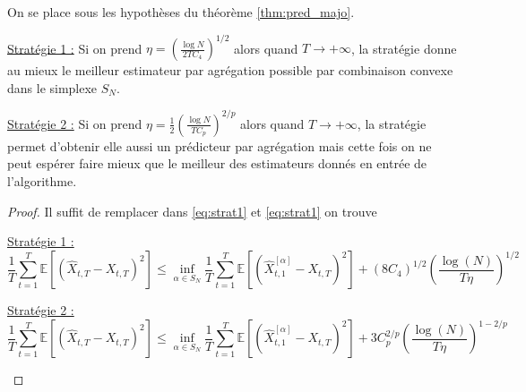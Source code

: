 \documentclass{report}
\begin{document}
\begin{Cor} On se place sous les hypothèses du théorème \ref{thm:pred_majo}. 
\begin{description}
\item{\underline{Stratégie 1 :}} Si on prend $\eta = \left(\frac{\log N}{2TC_4} \right)^{1/2}$ alors quand $T\to +\infty$, la stratégie donne au mieux le meilleur estimateur par agrégation possible par combinaison convexe dans le simplexe $S_N$.
\item{\underline{Stratégie 2 :}} Si on prend $\eta = \frac{1}{2}\left(\frac{\log N}{TC_p} \right)^{2/p}$ alors quand $T\to +\infty$, la stratégie permet d'obtenir elle aussi un prédicteur par agrégation mais cette fois on ne peut espérer faire mieux que le meilleur des estimateurs donnés en entrée de l'algorithme. 
\end{description}
\end{Cor}
\begin{proof}
Il suffit de remplacer dans \eqref{eq:strat1} et \eqref{eq:strat1} on trouve
\begin{description}
\item{\underline{Stratégie 1 :}}
$$
\frac{1}{T} \sum_{t=1}^T \mathbb{E}[(\hat X_{t,T}-X_{t,T})^2] \leq \inf_{\alpha \in S_N} \frac{1}{T} \sum_{t=1}^T \mathbb{E}[(\hat X_{t,1}^{[\alpha]}-X_{t,T})^2] + (8C_4)^{1/2} \left( \frac{\log(N)}{T \eta} \right)^{1/2}
$$
\item{\underline{Stratégie 2 :}}
$$
\frac{1}{T} \sum_{t=1}^T \mathbb{E}[(\hat X_{t,T}-X_{t,T})^2] \leq \inf_{\alpha \in S_N} \frac{1}{T} \sum_{t=1}^T \mathbb{E}[(\hat X_{t,1}^{[\alpha]}-X_{t,T})^2] + 3C_p^{2/p} \left( \frac{\log(N)}{T \eta} \right)^{1-2/p}
$$
\end{description}
\end{proof}
\end{document}
